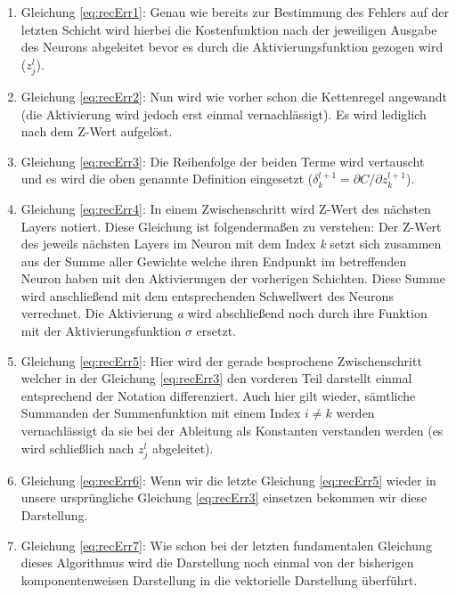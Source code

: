 \begin{enumerate}

\item Gleichung \ref{eq:recErr1}: Genau wie bereits zur Bestimmung des Fehlers auf der letzten Schicht wird hierbei die Kostenfunktion nach der jeweiligen Ausgabe des Neurons abgeleitet bevor es durch die Aktivierungsfunktion gezogen wird ($z^l_j$). 

\item Gleichung \ref{eq:recErr2}: Nun wird wie vorher schon die Kettenregel angewandt (die Aktivierung wird jedoch erst einmal vernachlässigt). Es wird lediglich nach dem Z-Wert aufgelöst.

\item Gleichung \ref{eq:recErr3}: Die Reihenfolge der beiden Terme wird vertauscht und es wird die oben genannte Definition eingesetzt ($\delta^{l+1}_k = \partial C / \partial z^{l+1}_k$). 

\item Gleichung \ref{eq:recErr4}: In einem Zwischenschritt wird Z-Wert des nächsten Layers notiert. Diese Gleichung ist folgendermaßen zu verstehen: Der Z-Wert des jeweils nächsten Layers im Neuron mit dem Index \emph{k} setzt sich zusammen aus der Summe aller Gewichte welche ihren Endpunkt im betreffenden Neuron haben mit den Aktivierungen der vorherigen Schichten. Diese Summe wird anschließend mit dem entsprechenden Schwellwert des Neurons verrechnet. Die Aktivierung \emph{a} wird abschließend noch durch ihre Funktion mit der Aktivierungsfunktion $\sigma$ ersetzt. 

\item Gleichung \ref{eq:recErr5}: Hier wird der gerade besprochene Zwischenschritt welcher in der Gleichung \ref{eq:recErr3} den vorderen Teil darstellt einmal entsprechend der Notation differenziert. Auch hier gilt wieder, sämtliche Summanden der Summenfunktion mit einem Index $i \neq k$ werden vernachlässigt da sie bei der Ableitung als Konstanten verstanden werden (es wird schließlich nach $z^l_j$ abgeleitet). 

\item Gleichung \ref{eq:recErr6}: Wenn wir die letzte Gleichung \ref{eq:recErr5} wieder in unsere ursprüngliche Gleichung \ref{eq:recErr3} einsetzen bekommen wir diese Darstellung. 

\item Gleichung \ref{eq:recErr7}: Wie schon bei der letzten fundamentalen Gleichung dieses Algorithmus wird die Darstellung noch einmal von der bisherigen komponentenweisen Darstellung in die vektorielle Darstellung überführt. 

\end{enumerate}




